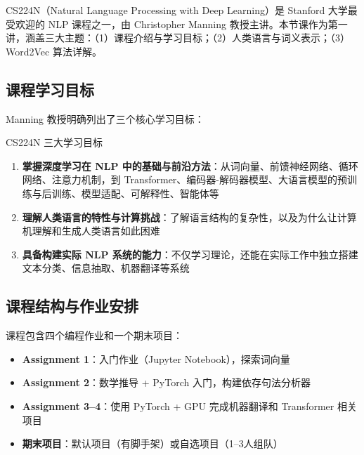 \documentclass[a4paper]{article}
\begin{document}
CS224N（Natural Language Processing with Deep Learning）是 Stanford 大学最受欢迎的 NLP 课程之一，由 Christopher Manning 教授主讲。本节课作为第一讲，涵盖三大主题：（1）课程介绍与学习目标；（2）人类语言与词义表示；（3）Word2Vec 算法详解。





\subsection{课程学习目标}

Manning 教授明确列出了三个核心学习目标：

\begin{importantbox}{CS224N 三大学习目标}
\begin{enumerate}
    \item \textbf{掌握深度学习在 NLP 中的基础与前沿方法}：从词向量、前馈神经网络、循环网络、注意力机制，到 Transformer、编码器-解码器模型、大语言模型的预训练与后训练、模型适配、可解释性、智能体等
    \item \textbf{理解人类语言的特性与计算挑战}：了解语言结构的复杂性，以及为什么让计算机理解和生成人类语言如此困难
    \item \textbf{具备构建实际 NLP 系统的能力}：不仅学习理论，还能在实际工作中独立搭建文本分类、信息抽取、机器翻译等系统
\end{enumerate}
\end{importantbox}





\subsection{课程结构与作业安排}

课程包含四个编程作业和一个期末项目：

\begin{itemize}
    \item \textbf{Assignment 1}：入门作业（Jupyter Notebook），探索词向量
    \item \textbf{Assignment 2}：数学推导 + PyTorch 入门，构建依存句法分析器
    \item \textbf{Assignment 3--4}：使用 PyTorch + GPU 完成机器翻译和 Transformer 相关项目
    \item \textbf{期末项目}：默认项目（有脚手架）或自选项目（1--3人组队）
\end{itemize}
\end{document}
